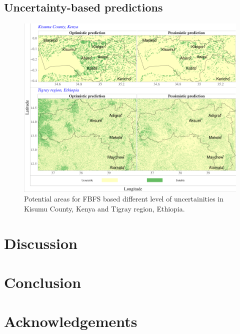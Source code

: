 \documentclass[]{elsarticle} %
\begin{document}
\hypertarget{section_3_5}{%
\subsection{Uncertainty-based predictions}\label{section_3_5}}

\begin{figure}[!h]

{\centering \includegraphics[width=1\linewidth,]{figures/Uncertainity_based_predictions_plot} 

}

\caption{Potential areas for FBFS based different level of uncertainities in Kisumu County, Kenya and Tigray region, Ethiopia.}\label{fig:fig10}
\end{figure}

\hypertarget{discussion}{%
\section{Discussion}\label{discussion}}

\hypertarget{conclusion}{%
\section{Conclusion}\label{conclusion}}

\hypertarget{refs}{}

\hypertarget{acknowledgements}{%
\section*{Acknowledgements}\label{acknowledgements}}
\end{document}
